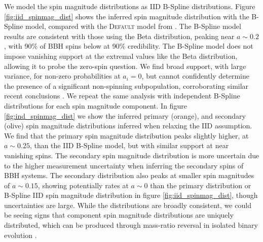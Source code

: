 We model the spin magnitude distributions as IID B-Spline distributions. 
Figure \ref{fig:iid_spinmag_dist} shows the inferred spin magnitude distribution with the B-Spline model, compared with the \textsc{Default} model from \citet{o3b_astro_dist}. 
The B-Spline model results are consistent with those using the Beta distribution, peaking near $a\sim0.2$, with 90\% of BBH spins below 
\result{$\CIPlusMinus{\macros[BSplineIIDCompSpins][a_90percentile]}$} at 90\% credibility. The B-Spline model does not impose vanishing support at the extremal values like the Beta distribution, 
allowing it to probe the zero-spin question. We find broad support, with large variance, for non-zero probabilities at $a_i=0$, but cannot confidently determine the presence of 
a significant non-spinning subpopulation, corroborating similar recent conclusions \citep{BuildBetterSpinModels,Callister_NoEvidence,GWTC3MonashSpin,Mould2022}. 
We repeat the same analysis with independent B-Spline distributions for each spin magnitude component. In figure \ref{fig:ind_spinmag_dist} 
we show the inferred primary (orange), and secondary (olive) spin magnitude distributions inferred when relaxing the IID assumption. We find that the primary spin magnitude distribution 
peaks slightly higher, at $a\sim0.25$, than the IID B-Spline model, but with similar support at near vanishing spins. The secondary spin magnitude distribution is more uncertain due to the 
higher measurement uncertainty when inferring the secondary spins of BBH systems. The secondary distribution also peaks at smaller spin magnitudes of $a\sim0.15$, showing potentially rates at $a\sim0$ than the primary distribution or B-Spline IID spin magnitude distribution in figure \ref{fig:iid_spinmag_dist}, though uncertainties are large. While the distributions are broadly consistent, we could be seeing signs that component spin magnitude distributions are uniquely distributed, which can be produced through mass-ratio reversal in isolated binary evolution \citep{Mould2022}.

